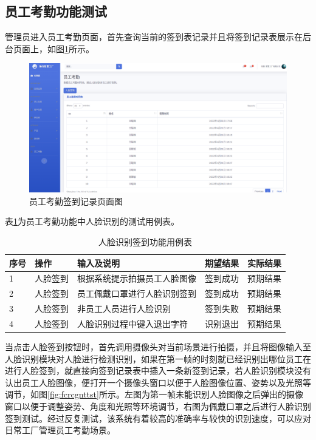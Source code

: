 \subsection{员工考勤功能测试}

管理员进入员工考勤页面，首先查询当前的签到表记录并且将签到记录表展示在后台页面上，如图\ref{fig:empleatdc}所示。

\begin{figure}[H]
    \centering
    \includegraphics[width=.55\textwidth]{figures/6employeeattendance.png}
    \caption{员工考勤签到记录页面图}
    \label{fig:empleatdc}
\end{figure}

表\ref{tab:fcrcgnts}为员工考勤功能中人脸识别的测试用例表。

\begin{table}[H]
    \centering
    \caption{人脸识别签到功能用例表}
    \label{tab:fcrcgnts}
    \begin{tabularx}{.95\textwidth}{p{2em}<{\centering}X<{\centering}p{16em}<{\centering}X<{\centering}X<{\centering}}
        \toprule
        序号 & 操作 & 输入及说明 & 期望结果 & 实际结果 \\
        \midrule
        1 & 人脸签到 & 根据系统提示拍摄员工人脸图像 & 签到成功 & 预期结果 \\
        2 & 人脸签到 & 员工佩戴口罩进行人脸识别签到 & 签到成功 & 预期结果 \\
        3 & 人脸签到 & 非员工人员进行人脸识别 & 签到失败 & 预期结果 \\
        4 & 人脸签到 & 人脸识别过程中键入退出字符 & 识别退出 & 预期结果 \\
        \bottomrule
    \end{tabularx}
\end{table}

当点击人脸签到按钮时，首先调用摄像头对当前场景进行拍摄，并且将图像输入至人脸识别模块对人脸进行检测识别，如果在第一帧的时刻就已经识别出哪位员工在进行人脸签到，就直接向签到记录表中插入一条新签到记录，若人脸识别模块没有认出员工人脸图像，便打开一个摄像头窗口以便于人脸图像位置、姿势以及光照等调节，如图\ref{fig:fcrcgnttst}所示。左图为第一帧未能识别人脸图像之后弹出的摄像窗口以便于调整姿势、角度和光照等环境调节，右图为佩戴口罩之后进行人脸识别签到测试。经过反复测试，该系统有着较高的准确率与较快的识别速度，可以应对日常工厂管理员工考勤场景。

